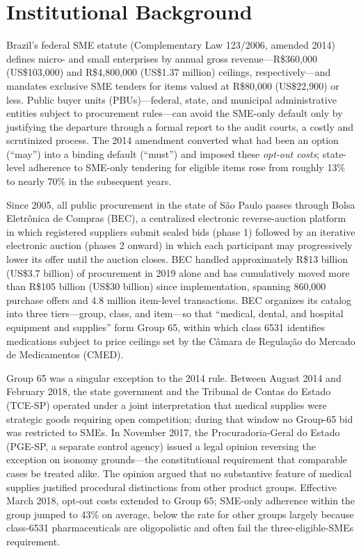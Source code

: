 \section{Institutional Background}\label{sec:institutional}

Brazil's federal SME statute (Complementary Law 123/2006, amended 2014) defines micro- and small enterprises by annual gross revenue---R\$360{,}000 (US\$103{,}000) and R\$4{,}800{,}000 (US\$1.37 million) ceilings, respectively---and mandates exclusive SME tenders for items valued at R\$80{,}000 (US\$22{,}900) or less. Public buyer units (PBUs)---federal, state, and municipal administrative entities subject to procurement rules---can avoid the SME-only default only by justifying the departure through a formal report to the audit courts, a costly and scrutinized process. The 2014 amendment converted what had been an option (``may'') into a binding default (``must'') and imposed these \emph{opt-out costs}; state-level adherence to SME-only tendering for eligible items rose from roughly 13\% to nearly 70\% in the subsequent years.

Since 2005, all public procurement in the state of S\~ao Paulo passes through Bolsa Eletr\^onica de Compras (BEC), a centralized electronic reverse-auction platform in which registered suppliers submit sealed bids (phase 1) followed by an iterative electronic auction (phases 2 onward) in which each participant may progressively lower its offer until the auction closes. BEC handled approximately R\$13 billion (US\$3.7 billion) of procurement in 2019 alone and has cumulatively moved more than R\$105 billion (US\$30 billion) since implementation, spanning 860{,}000 purchase offers and 4.8 million item-level transactions. BEC organizes its catalog into three tiers---group, class, and item---so that ``medical, dental, and hospital equipment and supplies'' form Group 65, within which class 6531 identifies medications subject to price ceilings set by the C\^amara de Regula\c{c}\~ao do Mercado de Medicamentos (CMED).

Group 65 was a singular exception to the 2014 rule. Between August 2014 and February 2018, the state government and the Tribunal de Contas do Estado (TCE-SP) operated under a joint interpretation that medical supplies were strategic goods requiring open competition; during that window no Group-65 bid was restricted to SMEs. In November 2017, the Procuradoria-Geral do Estado (PGE-SP, a separate control agency) issued a legal opinion reversing the exception on isonomy grounds---the constitutional requirement that comparable cases be treated alike. The opinion argued that no substantive feature of medical supplies justified procedural distinctions from other product groups. Effective March 2018, opt-out costs extended to Group 65; SME-only adherence within the group jumped to 43\% on average, below the rate for other groups largely because class-6531 pharmaceuticals are oligopolistic and often fail the three-eligible-SMEs requirement.

